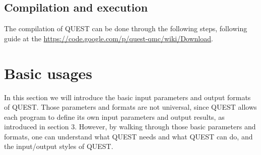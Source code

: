 \documentclass[12pt]{article}
\begin{document}
\subsection{Compilation and execution}
The compilation of QUEST can be done through the following steps, following guide at the 
\url{https://code.google.com/p/quest-qmc/wiki/Download}.

\section{Basic usages}
In this section we will introduce the basic input parameters and output formats of QUEST.
Those parameters and formats are not universal, since QUEST allows each program to define its own input parameters and output results, as introduced in section 3. However, by walking through those basic parameters and formats, one can understand what QUEST needs and what QUEST can do, and the input/output styles of QUEST.

\end{document}
